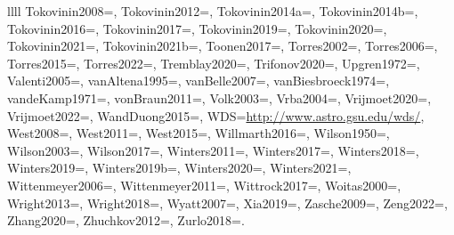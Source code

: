 \documentclass[twocolumn,tighten,twocolappendix]{aastex631}
\begin{document}
\begin{deluxetable*}{llll}
{Tokovinin2008=\cite{tokovinin2008},
Tokovinin2012=\cite{tokovinin2012},
Tokovinin2014a=\cite{tokovinin2014a},
Tokovinin2014b=\cite{tokovinin2014b},
Tokovinin2016=\cite{tokovinin2016},
Tokovinin2017=\cite{tokovinin2017},
Tokovinin2019=\cite{tokovinin2019},
Tokovinin2020=\cite{tokovinin2020},
Tokovinin2021=\cite{tokovinin2021},
Tokovinin2021b=\cite{tokovinin2021b},
Toonen2017=\cite{toonen2017},
Torres2002=\cite{torres2002},
Torres2006=\cite{torres2006},
Torres2015=\cite{torres2015},
Torres2022=\cite{torres2022},
Tremblay2020=\cite{tremblay2020},
Trifonov2020=\cite{trifonov2020},
Upgren1972=\cite{upgren1972},
Valenti2005=\cite{valenti2005},
vanAltena1995=\cite{vanaltena1995},
vanBelle2007=\cite{vanbelle2007},
vanBiesbroeck1974=\cite{vanbiesbroeck1974},
vandeKamp1971=\cite{vandekamp1971},
vonBraun2011=\cite{vonbraun2011},
Volk2003=\cite{volk2003},
Vrba2004=\cite{vrba2004},
Vrijmoet2020=\cite{vrijmoet2020},
Vrijmoet2022=\cite{vrijmoet2022},
WandDuong2015=\cite{wardduong2015},
WDS=\url{http://www.astro.gsu.edu/wds/},
West2008=\cite{west2008},
West2011=\cite{west2011},
West2015=\cite{west2015},
Willmarth2016=\cite{willmarth2016},
Wilson1950=\cite{wilson1950},
Wilson2003=\cite{wilson2003},
Wilson2017=\cite{wilson2017},
Winters2011=\cite{winters2011},
Winters2017=\cite{winters2017},
Winters2018=\cite{winters2018},
Winters2019=\cite{winters2019},
Winters2019b=\cite{winters2019b},
Winters2020=\cite{winters2020},
Winters2021=\cite{winters2021},
Wittenmeyer2006=\cite{wittenmyer2006},
Wittenmeyer2011=\cite{wittenmyer2011},
Wittrock2017=\cite{wittrock2017},
Woitas2000=\cite{woitas2000},
Wright2013=\cite{wright2013},
Wright2018=\cite{wright2018},
Wyatt2007=\cite{wyatt2007},
Xia2019=\cite{xia2019},
Zasche2009=\cite{zasche2009},
Zeng2022=\cite{zeng2022},
Zhang2020=\cite{zhang2020},
Zhuchkov2012=\cite{zhuchkov2012},
Zurlo2018=\cite{zurlo2018}.
}
\end{deluxetable*}
\end{document}
